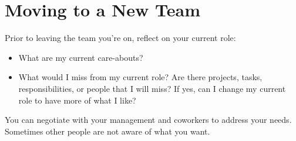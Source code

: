 
\clearpage
\section{Moving to a New Team}

Prior to leaving the team you're on, reflect on your current role:
\begin{itemize}
    \item What are my current care-abouts?
    \item What would I miss from my current role? Are there projects, tasks, responsibilities, or people that I will miss? If yes, can I change my current role to have more of what I like?
\end{itemize}
You can negotiate with your management and coworkers to address your needs. Sometimes other people are not aware of what you want. 

\ \\

